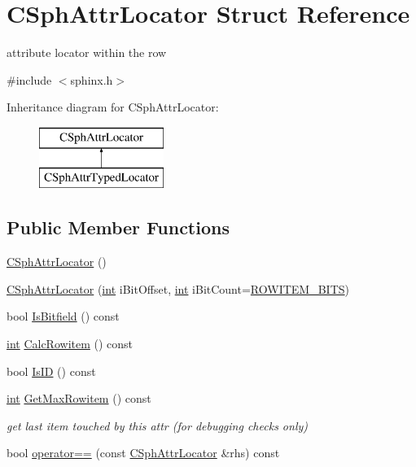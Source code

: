 \hypertarget{structCSphAttrLocator}{\section{C\-Sph\-Attr\-Locator Struct Reference}
\label{structCSphAttrLocator}
}


attribute locator within the row  




{\ttfamily \#include $<$sphinx.\-h$>$}

Inheritance diagram for C\-Sph\-Attr\-Locator\-:\begin{figure}[H]
\begin{center}
\leavevmode
\includegraphics[height=2.000000cm]{structCSphAttrLocator}
\end{center}
\end{figure}
\subsection*{Public Member Functions}
\begin{DoxyCompactItemize}
\item 
\hyperlink{structCSphAttrLocator_a7df289435d22e8acbbe572fd3d3ed28f}{C\-Sph\-Attr\-Locator} ()
\item 
\hyperlink{structCSphAttrLocator_a74d3122b608d9f6283479c47ca888b6b}{C\-Sph\-Attr\-Locator} (\hyperlink{sphinxexpr_8cpp_a4a26e8f9cb8b736e0c4cbf4d16de985e}{int} i\-Bit\-Offset, \hyperlink{sphinxexpr_8cpp_a4a26e8f9cb8b736e0c4cbf4d16de985e}{int} i\-Bit\-Count=\hyperlink{sphinx_8h_a6937b845951fd6969e2bd317ee978fe7}{R\-O\-W\-I\-T\-E\-M\-\_\-\-B\-I\-T\-S})
\item 
bool \hyperlink{structCSphAttrLocator_ad186402407f11f16467f94ce49b67854}{Is\-Bitfield} () const 
\item 
\hyperlink{sphinxexpr_8cpp_a4a26e8f9cb8b736e0c4cbf4d16de985e}{int} \hyperlink{structCSphAttrLocator_af98ae95533c7688d13022f1e063b1d89}{Calc\-Rowitem} () const 
\item 
bool \hyperlink{structCSphAttrLocator_ad1c5356a1e348d2e1006efff9b49fe45}{Is\-I\-D} () const 
\item 
\hyperlink{sphinxexpr_8cpp_a4a26e8f9cb8b736e0c4cbf4d16de985e}{int} \hyperlink{structCSphAttrLocator_ae691a2286a1404f08923e22030773e72}{Get\-Max\-Rowitem} () const 
\begin{DoxyCompactList}\small\item\em get last item touched by this attr (for debugging checks only) \end{DoxyCompactList}\item 
bool \hyperlink{structCSphAttrLocator_a15db3b0a07d4bf6bb1aec9aacf773726}{operator==} (const \hyperlink{structCSphAttrLocator}{C\-Sph\-Attr\-Locator} \&rhs) const 
\end{DoxyCompactItemize}
